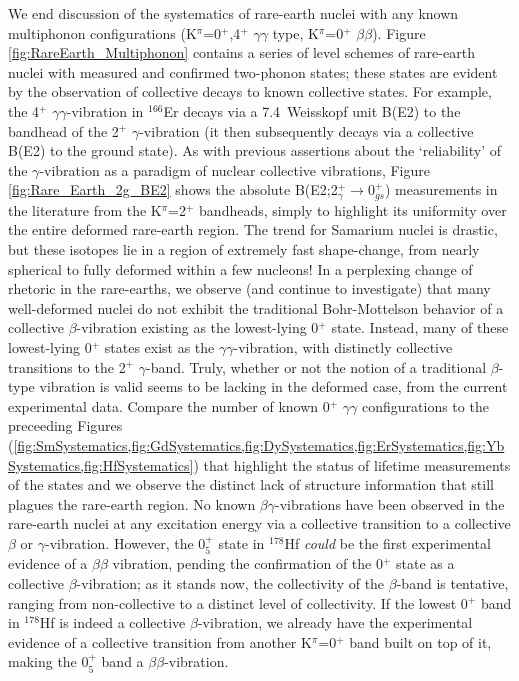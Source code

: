 We end discussion of the systematics of rare-earth nuclei with any known multiphonon configurations (K$^\pi$=0$^+$,4$^+$ $\gamma\gamma$ type, K$^\pi$=0$^+$ $\beta\beta$). Figure \ref{fig:RareEarth_Multiphonon} contains a series of level schemes of rare-earth nuclei with measured and confirmed two-phonon states; these states are evident by the observation of collective decays to known collective states. For example, the 4$^+$ $\gamma\gamma$-vibration in $^{166}$Er decays via a 7.4~Weisskopf unit B(E2) to the bandhead of the 2$^+$ $\gamma$-vibration (it then subsequently decays via a collective B(E2) to the ground state). As with previous assertions about the `reliability' of the $\gamma$-vibration as a paradigm of nuclear collective vibrations, Figure \ref{fig:Rare_Earth_2g_BE2} shows the absolute  B(E2;2$^+_\gamma\rightarrow$0$^+_{gs}$) measurements in the literature from the K$^\pi$=2$^+$ bandheads, simply to highlight its uniformity over the entire deformed rare-earth region. The trend for Samarium nuclei is drastic, but these isotopes lie in a region of extremely fast shape-change, from nearly spherical to fully deformed within a few nucleons! In a perplexing change of rhetoric in the rare-earths, we observe (and continue to investigate) that many well-deformed nuclei do not exhibit the traditional Bohr-Mottelson behavior of a collective $\beta$-vibration existing as the lowest-lying 0$^+$ state. Instead, many of these lowest-lying 0$^+$ states exist as the $\gamma\gamma$-vibration, with distinctly collective transitions to the 2$^+$ $\gamma$-band. Truly, whether or not the notion of a traditional $\beta$-type vibration is valid seems to be lacking in the deformed case, from the current experimental data. Compare the number of known 0$^+$ $\gamma\gamma$ configurations to the preceeding Figures (\ref{fig:SmSystematics,fig:GdSystematics,fig:DySystematics,fig:ErSystematics,fig:YbSystematics,fig:HfSystematics}) that highlight the status of lifetime measurements of the states and we observe the distinct lack of structure information that still plagues the rare-earth region. No known $\beta\gamma$-vibrations have been observed in the rare-earth nuclei at any excitation energy via a collective transition to a collective $\beta$ or $\gamma$-vibration. However, the 0$^+_5$ state in $^{178}$Hf \textit{could} be the first experimental evidence of a $\beta\beta$ vibration, pending the confirmation of the 0$^+$ state as a collective $\beta$-vibration; as it stands now, the collectivity of the $\beta$-band is tentative, ranging from non-collective to a distinct level of collectivity. If the lowest 0$^+$ band in $^{178}$Hf is indeed a collective $\beta$-vibration, we already have the experimental evidence of a collective transition from another K$^\pi$=0$^+$ band built on top of it, making the 0$^+_5$ band a $\beta\beta$-vibration.

